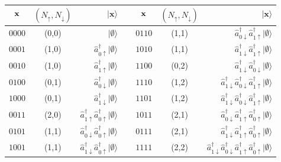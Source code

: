 \documentclass{article}
\newcommand{\pos}[1]{\mathbf{#1}}
\newcommand{\CRE}[1]{\hat{a}^\dagger_{#1}}
\begin{document}
\begin{table}[h!]
\centering
\begin{tabular}{ccrcccr}
\hline\hline
${\bf{x}}$ & $(N_\uparrow,N_\downarrow)$ & $| \pos{x} \rangle$ & \, & ${\bf{x}}$ & $(N_\uparrow,N_\downarrow)$ & $| \pos{x} \rangle$ \\
\hline
$ 0000 $ & (0,0) & $| \emptyset \rangle$ & & $0110 $ & (1,1) & $\CRE{0 \downarrow} \CRE{1 \uparrow} | \emptyset \rangle$ \\
$ 0001 $ & (1,0) & $\CRE{0 \uparrow} | \emptyset \rangle$ & & $ 1010 $ & (1,1) & $\CRE{1 \downarrow} \CRE{1 \uparrow} | \emptyset \rangle$ \\
$ 0010 $ & (1,0) & $\CRE{1 \uparrow} | \emptyset \rangle$ & & $ 1100 $ & (0,2) & $\CRE{1 \downarrow} \CRE{0 \downarrow} | \emptyset \rangle$ \\
$ 0100 $ & (0,1) & $\CRE{0 \downarrow} | \emptyset \rangle$ & & $ 1110 $ & (1,2) & $\CRE{1 \downarrow} \CRE{0 \downarrow} \CRE{1 \uparrow} | \emptyset \rangle$ \\
$ 1000 $ & (0,1) & $\CRE{1 \downarrow} | \emptyset \rangle$ & & $ 1101 $ & (1,2) & $\CRE{1 \downarrow} \CRE{0 \downarrow} \CRE{1 \uparrow} | \emptyset \rangle$ \\
$ 0011 $ & (2,0) & $\CRE{1 \uparrow} \CRE{0 \uparrow} | \emptyset \rangle$ & & $1011 $ & (2,1) & $\CRE{0 \downarrow} \CRE{1 \uparrow} \CRE{0 \uparrow} | \emptyset \rangle$ \\
$ 0101 $ & (1,1) & $\CRE{0 \downarrow} \CRE{0 \uparrow} | \emptyset \rangle$ & & $ 0111 $ & (2,1) & $\CRE{1 \downarrow}  \CRE{1 \uparrow} \CRE{0 \uparrow} | \emptyset \rangle$ \\
$ 1001 $ & (1,1) & $\CRE{1 \downarrow} \CRE{0 \uparrow} | \emptyset \rangle$ & & $ 1111 $ & (2,2) & $\CRE{1 \downarrow} \CRE{0 \downarrow} \CRE{1 \uparrow} \CRE{0 \uparrow} | \emptyset \rangle$ \\
\hline\hline
\end{tabular}
\end{table}
\end{document}
